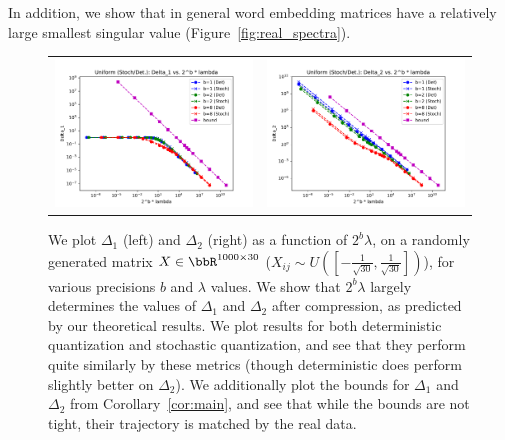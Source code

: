 In addition, we show that in general word embedding matrices have a relatively large smallest singular value (Figure~\ref{fig:real_spectra}).

\begin{figure}
	\centering
	\begin{tabular}{c c}
		\includegraphics[width=0.4\linewidth]{figures/micro_uniform_nonadapt_delta1_vs_2_b_lambda.pdf} &	
		\includegraphics[width=0.4\linewidth]{figures/micro_uniform_nonadapt_delta2_vs_2_b_lambda.pdf}
	\end{tabular}
	\caption{We plot $\Delta_1$ (left) and $\Delta_2$ (right) as a function of $2^b\lambda$, on a randomly generated matrix $X\in\RR^{1000\times 30}$ ($X_{ij}\sim U([-\frac{1}{\sqrt{30}},\frac{1}{\sqrt{30}}])$), for various precisions $b$ and $\lambda$ values.  We show that $2^b \lambda$ largely determines the values of $\Delta_1$ and $\Delta_2$ after compression, as predicted by our theoretical results. We plot results for both deterministic quantization and stochastic quantization, and see that they perform quite similarly by these metrics (though deterministic does perform slightly better on $\Delta_2$). We additionally plot the bounds for $\Delta_1$ and $\Delta_2$ from Corollary~\ref{cor:main}, and see that while the bounds are not tight, their trajectory is matched by the real data.}
	\label{fig:micro_d1d2}
\end{figure}

